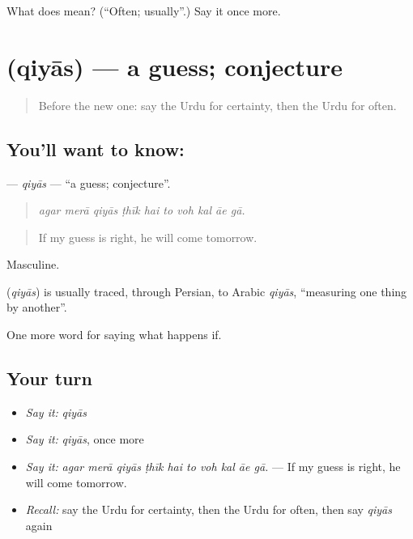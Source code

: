 \begin{tcolorbox}[breakable,colback=teal!4,colframe=teal!35!black,title={Before you move on}]
What does  mean? (\textquotedblleft{}Often; usually\textquotedblright{}.) Say it once more.
\end{tcolorbox}
\section[\texorpdfstring{\ur{قیاس} (qiyās)}{قیاس (qiyās)}]{ (qiyās) — a guess; conjecture}

\label{lesson:UR-C362-qiyas}



\begin{quote}
Before the new one: say the Urdu for certainty, then the Urdu for often.
\end{quote}

\subsection*{You'll want to know: }
\textbf{} — \emph{qiyās} — \textquotedblleft{}a guess; conjecture\textquotedblright{}.

\begin{quote}
         
\end{quote}

\begin{quote}
\emph{agar merā qiyās ṭhīk hai to voh kal āe gā.}
\end{quote}

\begin{quote}
If my guess is right, he will come tomorrow.
\end{quote}

Masculine.

\begin{cousinweb}
\textbf{} (\emph{qiyās}) is usually traced, through Persian, to Arabic \emph{qiyās}, \textquotedblleft{}measuring one thing by another\textquotedblright{}.
\end{cousinweb}

\begin{grammarlens}[title={What you've built}]
One more word for saying what happens if.
\end{grammarlens}

\subsection*{Your turn}
\begin{itemize}
\raggedright
  \item \emph{Say it:} \emph{qiyās}
  \item \emph{Say it:} \emph{qiyās}, once more
  \item \emph{Say it:} \emph{agar merā qiyās ṭhīk hai to voh kal āe gā.} — If my guess is right, he will come tomorrow.
  \item \emph{Recall:} say the Urdu for certainty, then the Urdu for often, then say \emph{qiyās} again
\end{itemize}

